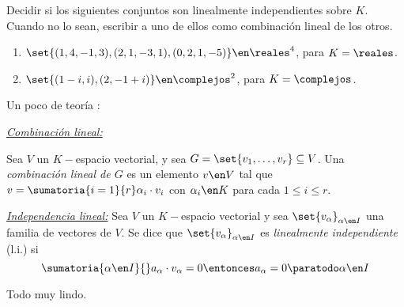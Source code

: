 \begin{enunciado}{\ejercicio}
  Decidir si los siguientes conjuntos son linealmente independientes sobre $K$. Cuando no lo sean,
  escribir a uno de ellos como combinación lineal de los otros.
  \begin{enumerate}[label=(\alph*)]
    \item $\set{(1,4,-1,3), (2,1,-3,1),(0,2,1,-5)} \en \reales^4$, para $K = \reales$.
    \item $\set{(1 - i, i), (2,-1 + i)} \en \complejos^2$, para $K = \complejos$.
  \end{enumerate}
\end{enunciado}

Un poco de teoría \rollingEyes:

\textit{\ul{Combinación lineal:}}

Sea $V$ un $K-$espacio vectorial, y sea $G = \set{v_1,\ldots,v_r} \subseteq V$.
Una \textit{combinación lineal de $G$} es un elemento $v \en V$ tal que $v = \sumatoria{i=1}{r} \alpha_i \cdot v_i$ con
$\alpha_i \en K$ para cada $1 \leq i \leq r$.

\textit{\ul{Independencia lineal:}}
Sea $V$ un $K-$espacio vectorial y sea $\set{v_\alpha}_{\alpha \en I}$ una familia de vectores de $V$. Se
dice que  $\set{v_{\alpha}}_{\alpha \en I}$ es \textit{linealmente independiente} (l.i.) si
$$
  \sumatoria{\alpha \en I}{} a_{\alpha} \cdot v_{\alpha} = 0 \entonces a_{\alpha} = 0 \paratodo \alpha \en I
$$

\bigskip

Todo muy lindo.

